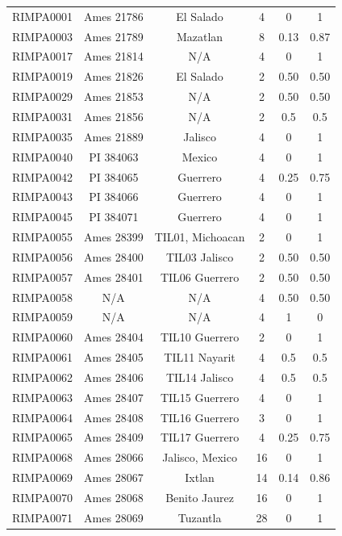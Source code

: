 \documentclass[11pt]{article}
\newcounter{rowno}
\begin{document}
\begin{scriptsize}
\begin{longtable}{>{\stepcounter{rowno}}cccccc}
    RIMPA0001 & Ames 21786 & El Salado & 4     & 0     & 1 \\
    RIMPA0003 & Ames 21789 & Mazatlan & 8 & 0.13 & 0.87 \\
    RIMPA0017 & Ames 21814  & N/A   & 4     & 0     & 1 \\
    RIMPA0019 & Ames 21826 & El Salado & 2     & 0.50   & 0.50 \\
    RIMPA0029 & Ames 21853 & N/A   & 2     & 0.50   & 0.50 \\
    RIMPA0031 & Ames 21856 & N/A   & 2     & 0.5   & 0.5 \\
    RIMPA0035 & Ames 21889 & Jalisco & 4     & 0     & 1 \\
    RIMPA0040 & PI 384063 & Mexico & 4     & 0     & 1 \\
    RIMPA0042 & PI 384065 & Guerrero & 4     & 0.25  & 0.75 \\
    RIMPA0043 & PI 384066 & Guerrero & 4     & 0     & 1 \\
    RIMPA0045 & PI 384071 & Guerrero & 4     & 0     & 1 \\
    RIMPA0055 & Ames 28399 & TIL01, Michoacan & 2     & 0     & 1 \\
    RIMPA0056 & Ames 28400 & TIL03 Jalisco & 2     & 0.50   & 0.50 \\
    RIMPA0057 & Ames 28401 & TIL06 Guerrero & 2     & 0.50   & 0.50 \\
    RIMPA0058 & N/A   & N/A   & 4     & 0.50   & 0.50 \\
    RIMPA0059 & N/A   & N/A   & 4     & 1     & 0 \\
    RIMPA0060 & Ames 28404 & TIL10 Guerrero & 2     & 0     & 1 \\
    RIMPA0061 & Ames 28405 & TIL11 Nayarit & 4     & 0.5   & 0.5 \\
    RIMPA0062 & Ames 28406 & TIL14 Jalisco & 4     & 0.5   & 0.5 \\
    RIMPA0063 & Ames 28407 & TIL15 Guerrero & 4     & 0     & 1 \\
    RIMPA0064 & Ames 28408 & TIL16 Guerrero & 3     & 0     & 1 \\
    RIMPA0065 & Ames 28409 & TIL17 Guerrero & 4     & 0.25  & 0.75 \\
    RIMPA0068 & Ames 28066 & Jalisco, Mexico & 16    & 0     & 1 \\
    RIMPA0069 & Ames 28067 & Ixtlan & 14    & 0.14 & 0.86 \\
    RIMPA0070 & Ames 28068 & Benito Jaurez & 16    & 0     & 1 \\
    RIMPA0071 & Ames 28069 & Tuzantla & 28    & 0     & 1 \\

\end{longtable}
\end{scriptsize}
\end{document}
